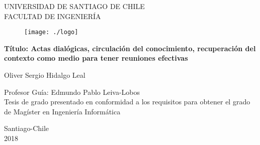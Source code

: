 \begin{titlepage}

\begin{center}
	\vspace*{-1in}
	\begin{center}
	
		UNIVERSIDAD DE SANTIAGO DE CHILE\\
		\vspace*{0.15in}
		FACULTAD DE INGENIERÍA \\
		\vspace*{0.6in}

		\begin{figure}[htb]
			\begin{flushright}
				\texttt{[image: ./logo]}
			\end{flushright}
		\end{figure}

	\end{center}	
	

	\vspace*{0.2in}
	
	\begin{Large}
		\textbf{Título: Actas dialógicas, circulación del conocimiento, recuperación del contexto como medio para tener reuniones efectivas} \\
	\end{Large}
		\vspace*{0.3in}

	\begin{large}
		Oliver Sergio Hidalgo Leal
	\end{large}
	
	\vspace*{0.3in}
	\vspace*{0.1in}
	
	\begin{large}
		Profesor Guía: Edmundo Pablo Leiva-Lobos \\
		Tesis de grado presentado en conformidad a los requisitos para obtener el grado de Magíster en Ingeniería Informática \\
	\end{large}

	\begin{center}
		Santiago-Chile \\
		2018
	\end{center}
	
\end{center}
\end{titlepage}